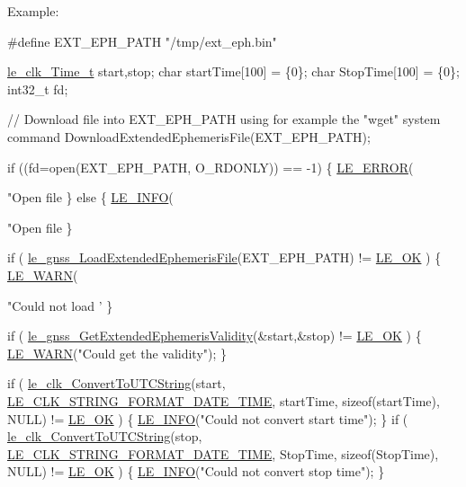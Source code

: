 Example\+:


\begin{DoxyCode}
\textcolor{preprocessor}{#define EXT\_EPH\_PATH     "/tmp/ext\_eph.bin"}

\hyperlink{structle__clk___time__t}{le\_clk\_Time\_t} start,stop;
\textcolor{keywordtype}{char} startTime[100] = \{0\};
\textcolor{keywordtype}{char} StopTime[100] = \{0\};
int32\_t fd;

\textcolor{comment}{// Download file into EXT\_EPH\_PATH using for example the "wget" system command}
DownloadExtendedEphemerisFile(EXT\_EPH\_PATH);

\textcolor{keywordflow}{if} ((fd=open(EXT\_EPH\_PATH, O\_RDONLY)) == -1)
\{
    \hyperlink{le__log_8h_a353590f91b3143a7ba3a416ae5a50c3d}{LE\_ERROR}(\textcolor{stringliteral}{"Open file %
\}
\textcolor{keywordflow}{else}
\{
    \hyperlink{le__log_8h_a23e6d206faa64f612045d688cdde5808}{LE\_INFO}(\textcolor{stringliteral}{"Open file %
\}

\textcolor{keywordflow}{if} ( \hyperlink{le__gnss__interface_8h_aea1811e39dfae1516b08404adfbaec22}{le\_gnss\_LoadExtendedEphemerisFile}(EXT\_EPH\_PATH) != 
      \hyperlink{le__basics_8h_a1cca095ed6ebab24b57a636382a6c86ca5066a4bcec691c6b67843b8f79656422}{LE\_OK} )
\{
   \hyperlink{le__log_8h_a0201b2f60ee0e945479f91e181bf04b6}{LE\_WARN}(\textcolor{stringliteral}{"Could not load '%
\}

\textcolor{keywordflow}{if} ( \hyperlink{le__gnss__interface_8h_a1fbfc55e9e7585646fb312d7017061ff}{le\_gnss\_GetExtendedEphemerisValidity}(&start,&stop) != 
      \hyperlink{le__basics_8h_a1cca095ed6ebab24b57a636382a6c86ca5066a4bcec691c6b67843b8f79656422}{LE\_OK} )
\{
   \hyperlink{le__log_8h_a0201b2f60ee0e945479f91e181bf04b6}{LE\_WARN}(\textcolor{stringliteral}{"Could get the validity"});
\}

\textcolor{keywordflow}{if} ( \hyperlink{le__clock_8h_ae06285727609683956c22f6af2937f64}{le\_clk\_ConvertToUTCString}(start,
                               \hyperlink{le__clock_8h_af9a6489508554d27a4f927227e2eeb7c}{LE\_CLK\_STRING\_FORMAT\_DATE\_TIME},
                               startTime,
                               \textcolor{keyword}{sizeof}(startTime),
                               NULL) != \hyperlink{le__basics_8h_a1cca095ed6ebab24b57a636382a6c86ca5066a4bcec691c6b67843b8f79656422}{LE\_OK} )
\{
    \hyperlink{le__log_8h_a23e6d206faa64f612045d688cdde5808}{LE\_INFO}(\textcolor{stringliteral}{"Could not convert start time"});
\}
\textcolor{keywordflow}{if} ( \hyperlink{le__clock_8h_ae06285727609683956c22f6af2937f64}{le\_clk\_ConvertToUTCString}(stop,
                               \hyperlink{le__clock_8h_af9a6489508554d27a4f927227e2eeb7c}{LE\_CLK\_STRING\_FORMAT\_DATE\_TIME},
                               StopTime,
                               \textcolor{keyword}{sizeof}(StopTime),
                               NULL) != \hyperlink{le__basics_8h_a1cca095ed6ebab24b57a636382a6c86ca5066a4bcec691c6b67843b8f79656422}{LE\_OK} )
\{
    \hyperlink{le__log_8h_a23e6d206faa64f612045d688cdde5808}{LE\_INFO}(\textcolor{stringliteral}{"Could not convert stop time"});
\}

}}}
\end{DoxyCode}
